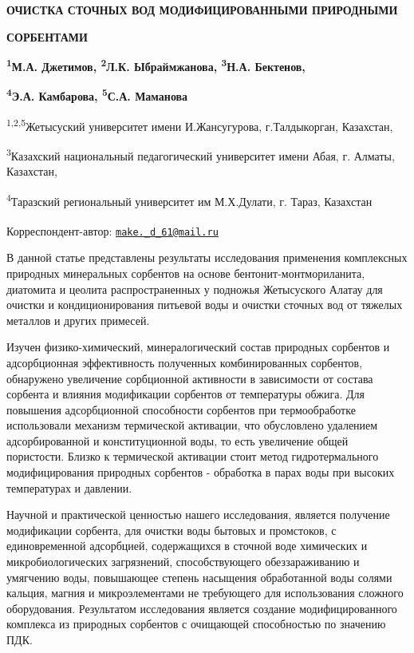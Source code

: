 
{\bfseries ОЧИСТКА СТОЧНЫХ ВОД МОДИФИЦИРОВАННЫМИ ПРИРОДНЫМИ}

{\bfseries СОРБЕНТАМИ}

{\bfseries \textsuperscript{1}М.А. Джетимов\textsuperscript{\envelope },
\textsuperscript{2}Л.К. Ыбраймжанова, \textsuperscript{3}Н.А. Бектенов,}

{\bfseries \textsuperscript{4}Э.А. Камбарова, \textsuperscript{5}С.А.
Маманова}

\textsuperscript{1,2,5}Жетысуский университет имени И.Жансугурова,
г.Талдыкорган, Казахстан,

\textsuperscript{3}Казахский национальный педагогический университет
имени Абая, г. Алматы, Казахстан,

\textsuperscript{4}Таразский региональный университет им М.Х.Дулати, г.
Тараз, Казахстан

{\bfseries \textsuperscript{\envelope }}Корреспондент-автор:
\href{mailto:make._d_61@mail.ru}{\nolinkurl{make.\_d\_61@mail.ru}}

В данной статье представлены результаты исследования применения
комплексных природных минеральных сорбентов на основе
бентонит-монтмориланита, диатомита и цеолита распространенных у подножья
Жетысуского Алатау для очистки и кондиционирования питьевой воды и
очистки сточных вод от тяжелых металлов и других примесей.

Изучен физико-химический, минералогический состав природных сорбентов и
адсорбционная эффективность полученных комбинированных сорбентов,
обнаружено увеличение сорбционной активности в зависимости от состава
сорбента и влияния модификации сорбентов от температуры обжига. Для
повышения адсорбционной способности сорбентов при термообработке
использовали механизм термической активации, что обусловлено удалением
адсорбированной и конституционной воды, то есть увеличение общей
пористости. Близко к термической активации стоит метод гидротермального
модифицирования природных сорбентов - обработка в парах воды при высоких
температурах и давлении.

Научной и практической ценностью нашего исследования, является получение
модификации сорбента, для очистки воды бытовых и промстоков, с
единовременной адсорбцией, содержащихся в сточной воде химических и
микробиологических загрязнений, способствующего обеззараживанию и
умягчению воды, повышающее степень насыщения обработанной воды солями
кальция, магния и микроэлементами не требующего для использования
сложного оборудования. Результатом исследования является создание
модифицированного комплекса из природных сорбентов с очищающей
способностью по значению ПДК.

